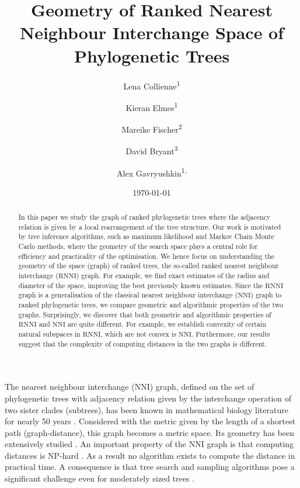 \documentclass{amsart}
\title[Ranked Nearest Neighbour Intarchange]{Geometry of Ranked Nearest Neighbour Interchange Space of Phylogenetic Trees}
\date{\today}
\author{Lena Collienne\textsuperscript{1}}
\author{Kieran Elmes\textsuperscript{1}}
\author{Mareike Fischer\textsuperscript{2}}
\author{David Bryant\textsuperscript{3}}
\author{Alex Gavryushkin\textsuperscript{1, \Letter}}
\newcommand{\nni}{\mathrm{NNI}}
\newcommand{\rnni}{\mathrm{RNNI}}
\begin{document}
\begin{abstract}
In this paper we study the graph of ranked phylogenetic trees where the adjacency relation is given by a local rearrangement of the tree structure.
Our work is motivated by tree inference algorithms, such as maximum likelihood and Markov Chain Monte Carlo methods, where the geometry of the search space plays a central role for efficiency and practicality of the optimisation.
We hence focus on understanding the geometry of the space (graph) of ranked trees, the so-called ranked nearest neighbour interchange ($\rnni$) graph.
For example, we find exact estimates of the radius and diameter of the space, improving the best previously known estimates.
Since the $\rnni$ graph is a generalisation of the classical nearest neighbour interchange ($\nni$) graph to ranked phylogenetic trees, we compare geometric and algorithmic properties of the two graphs.
Surprisingly, we discover that both geometric and algorithmic properties of $\rnni$ and $\nni$ are quite different.
For example, we establish convexity of certain natural subspaces in $\rnni$, which are not convex is $\nni$.
Furthermore, our results suggest that the complexity of computing distances in the two graphs is different.
\end{abstract}


\maketitle

The nearest neighbour interchange ($\nni$) graph, defined on the set of phylogenetic trees with adjacency relation given by the interchange operation of two sister clades (subtrees), has been known in mathematical biology literature for nearly 50 years \autocite{Robinson1971-ql,Moore1973-kk}.
Considered with the metric given by the length of a shortest path (graph-distance), this graph becomes a metric space.
Its geometry has been extensively studied \autocite{Dasgupta2000-xa, Li1996-zw, Gordon2013-fw, De_Jong2016-al}.
An important property of the $\nni$ graph is that computing distances is NP-hard \autocite{Dasgupta2000-xa}.
As a result no algorithm exists to compute the distance in practical time.
A consequence is that tree search and sampling algorithms pose a significant challenge even for moderately sized trees
\autocite{Whidden2016-kl}.
\end{document}
